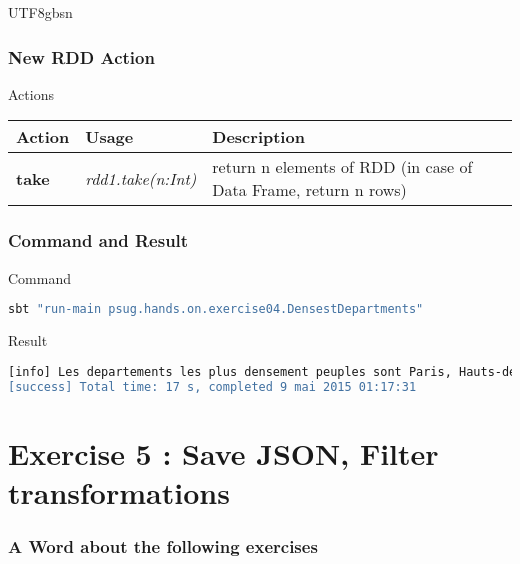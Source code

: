 \documentclass[slidetop,9pt,utf8]{beamer}
\begin{document}
\begin{CJK}{UTF8}{gbsn}
\begin{frame}
\end{frame}

\begin{frame}

  \frametitle{New RDD Action}

  \begin{block}{Actions}
    \begin{center}
      \begin{tabular}{|m{2.1cm}|m{3.5cm}|m{5cm}|}
        \hline 
        \rowcolor{gray} \textbf{Action} & \textbf{Usage} & \textbf{Description} \\ \hline
        \textbf{take} & \textit{rdd1.take(n:Int)} & return n elements of RDD (in case of Data Frame, return n rows) \\ \hline
      \end{tabular}
    \end{center}
  \end{block}

\end{frame}

\begin{frame}[fragile]
  \frametitle{Command and Result}

  \begin{block}{Command}
    \begin{lstlisting}[language=bash, style=terminal]
sbt "run-main psug.hands.on.exercise04.DensestDepartments"
    \end{lstlisting}
  \end{block}

  \begin{block}{Result}
    \begin{lstlisting}[language=bash, style=terminal]
[info] Les departements les plus densement peuples sont Paris, Hauts-de-Seine, Seine-Saint-Denis, Val-de-Marne, Val-d'Oise, Essonne, Yvelines, Rhone, Nord, Bouches-du-Rhone
[success] Total time: 17 s, completed 9 mai 2015 01:17:31
    \end{lstlisting}
  \end{block}

\end{frame}

\section{Exercise 5 : Save JSON, Filter transformations}

\begin{frame}
  \frametitle{A Word about the following exercises}


\end{frame}
\end{CJK}
\end{document}
